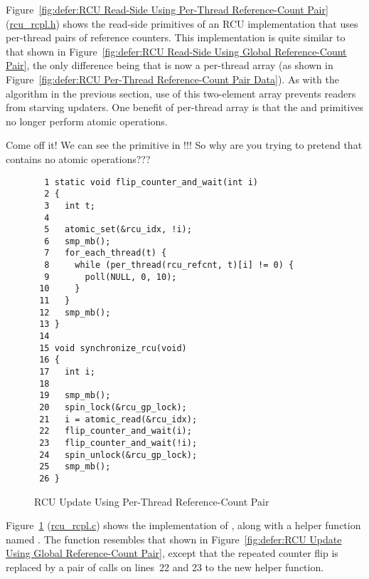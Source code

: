 Figure~\ref{fig:defer:RCU Read-Side Using Per-Thread Reference-Count Pair}
(\url{rcu_rcpl.h})
shows the read-side primitives of an RCU implementation that uses per-thread
pairs of reference counters.
This implementation is quite similar to that shown in
Figure~\ref{fig:defer:RCU Read-Side Using Global Reference-Count Pair},
the only difference being that  is now a per-thread
array (as shown in
Figure~\ref{fig:defer:RCU Per-Thread Reference-Count Pair Data}).
As with the algorithm in the previous section, use of this two-element
array prevents readers from starving updaters.
One benefit of per-thread  array is that the
 and  primitives no longer
perform atomic operations.

\QuickQuiz{}
	Come off it!
	We can see the  primitive in
	!!!
	So why are you trying to pretend that 
	contains no atomic operations???
 \QuickQuizEnd

\begin{figure}[tbp]
{ \scriptsize
\begin{verbatim}
  1 static void flip_counter_and_wait(int i)
  2 {
  3   int t;
  4
  5   atomic_set(&rcu_idx, !i);
  6   smp_mb();
  7   for_each_thread(t) {
  8     while (per_thread(rcu_refcnt, t)[i] != 0) {
  9       poll(NULL, 0, 10);
 10     }
 11   }
 12   smp_mb();
 13 }
 14
 15 void synchronize_rcu(void)
 16 {
 17   int i;
 18
 19   smp_mb();
 20   spin_lock(&rcu_gp_lock);
 21   i = atomic_read(&rcu_idx);
 22   flip_counter_and_wait(i);
 23   flip_counter_and_wait(!i);
 24   spin_unlock(&rcu_gp_lock);
 25   smp_mb();
 26 }
\end{verbatim}
}
\caption{RCU Update Using Per-Thread Reference-Count Pair}
\label{fig:defer:RCU Update Using Per-Thread Reference-Count Pair}
\end{figure}

Figure~\ref{fig:defer:RCU Update Using Per-Thread Reference-Count Pair}
(\url{rcu_rcpl.c})
shows the implementation of , along with a helper
function named .
The  function resembles that shown in
Figure~\ref{fig:defer:RCU Update Using Global Reference-Count Pair},
except that the repeated counter flip is replaced by a pair of calls
on lines~22 and 23 to the new helper function.


